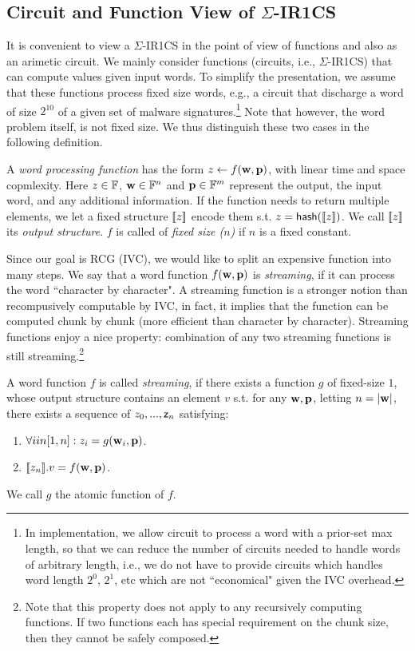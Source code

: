 \subsection{Circuit and Function View of $\Sigma$-IR1CS}
It is convenient to view a $\Sigma$-IR1CS in the point of view of
functions and also as an arimetic circuit. 
We mainly consider functions (circuits, i.e., $\Sigma$-IR1CS)
that can compute values given input words. To simplify 
the presentation, we assume that these functions process
fixed size words, e.g., a circuit that discharge a word of
size $2^{10}$ of a given set of malware signatures.\footnote{In 
implementation, we allow circuit to process a word with a prior-set
max length, so that we can reduce the number of circuits needed
to handle words of arbitrary length, i.e., we do not have to
provide circuits which handles word length $2^0$, $2^1$, etc
which are not ``economical" given the IVC overhead.} 
Note that however, the word problem itself, is not fixed size.
We thus distinguish these two cases in the following definition.

\begin{definition} A {\em word processing function} 
has the form
$z \leftarrow f({{\mathbf {w}}}, {{\mathbf {p}}})$, with linear time and
space copmlexity.  Here $z\in \mathbb{F}$, ${{\mathbf {w}}} \in \mathbb{F}^n$ and
${{\mathbf {p}}} \in \mathbb{F}^m$ represent the output, the input word,
and any additional information. If the function 
needs to return multiple elements, we let a fixed structure
$[\![z]\!]$ encode them s.t.  $z = \mathsf{hash}([\![z]\!])$. We call
$[\![z]\!]$ its {\em output structure}.
$f$ is called of {\em fixed size ($n$)} if $n$ is a fixed constant. 
\end{definition}

Since our goal is RCG (IVC), we would like to split an expensive
function into many steps.  We say that a word function 
$f({{\mathbf {w}}}, {{\mathbf {p}}})$ is {\em streaming}, if it can
process the word ``character by character". A streaming
function is a stronger notion than recompusively computable by IVC,
in fact, it implies that the function
can be computed chunk by chunk (more efficient than character by character).
Streaming functions enjoy a nice property: 
combination of any two streaming functions is still
streaming.\footnote{Note that this property does not apply to
any recursively computing functions. If two functions each has
special requirement on the chunk size, then they cannot be safely composed.}

\begin{definition} A word function $f$
is called {\em streaming}, if there exists 
a function $g$ of fixed-size $1$,
whose output structure contains an element $v$
s.t. for any ${{\mathbf {w}}}, {{\mathbf {p}}}$, letting $n = |{{\mathbf {w}}}|$,
there exists a sequence of $z_0, ..., \mathsf{z}_{n}$ satisfying:
\begin{enumerate}
	\item$\forall i in [1,n]: z_i = g({{\mathbf {w}}}_i, {{\mathbf {p}}})$.
	\item $[\![z_{n}]\!].v = f({{\mathbf {w}}}, {{\mathbf {p}}})$.
\end{enumerate}
We call $g$ the atomic function of $f$.
\end{definition}

